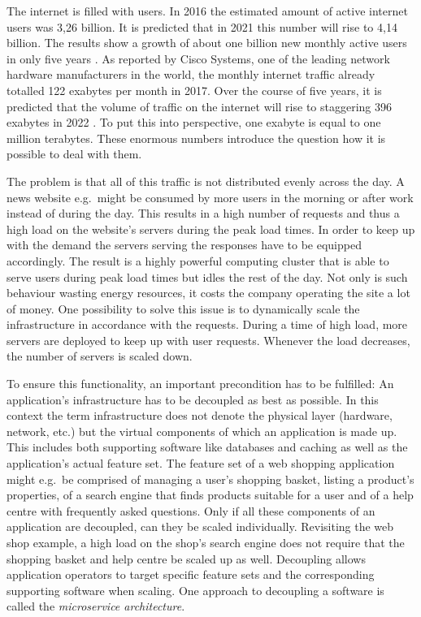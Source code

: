 
The internet is filled with users. In 2016 the estimated amount of active
internet users was 3,26 billion. It is predicted that in 2021 this number will
rise to 4,14 billion. The results show a growth of about one billion new
monthly active users in only five years
\autocite{eMarketerAnzahlderInternetnutzer2017}. As reported by Cisco Systems,
one of the leading network hardware manufacturers in the world, the monthly
internet traffic already totalled 122 exabytes per month in 2017. Over the
course of five years, it is predicted that the volume of traffic on the
internet will rise to staggering 396 exabytes in 2022
\autocite{SystemsDatenvolumendesglobalen2018}. To put this into perspective,
one exabyte is equal to one million terabytes. These enormous numbers introduce
the question how it is possible to deal with them.

The problem is that all of this traffic is not distributed evenly across the
day. A news website e.g.\ might be consumed by more users in the morning or
after work instead of during the day. This results in a high number of requests
and thus a high load on the website's servers during the peak load times. In
order to keep up with the demand the servers serving the responses have to be
equipped accordingly. The result is a highly powerful computing cluster that is
able to serve users during peak load times but idles the rest of the day. Not
only is such behaviour wasting energy resources, it costs the company operating
the site a lot of money. One possibility to solve this issue is to dynamically
scale the infrastructure in accordance with the requests.  During a time of
high load, more servers are deployed to keep up with user requests. Whenever
the load decreases, the number of servers is scaled down.

To ensure this functionality, an important precondition has to be fulfilled: An
application's infrastructure has to be decoupled as best as possible. In this
context the term infrastructure does not denote the physical layer (hardware,
network, etc.) but the virtual components of which an application is made up.
This includes both supporting software like databases and caching as well as
the application's actual feature set. The feature set of a web shopping
application might e.g.\ be comprised of managing a user's shopping basket,
listing a product's properties, of a search engine that finds products suitable
for a user and of a help centre with frequently asked questions. Only if all
these components of an application are decoupled, can they be scaled
individually. Revisiting the web shop example, a high load on the shop's search
engine does not require that the shopping basket and help centre be scaled up
as well. Decoupling allows application operators to target specific feature
sets and the corresponding supporting software when scaling. One approach to
decoupling a software is called the \textit{microservice architecture}.


